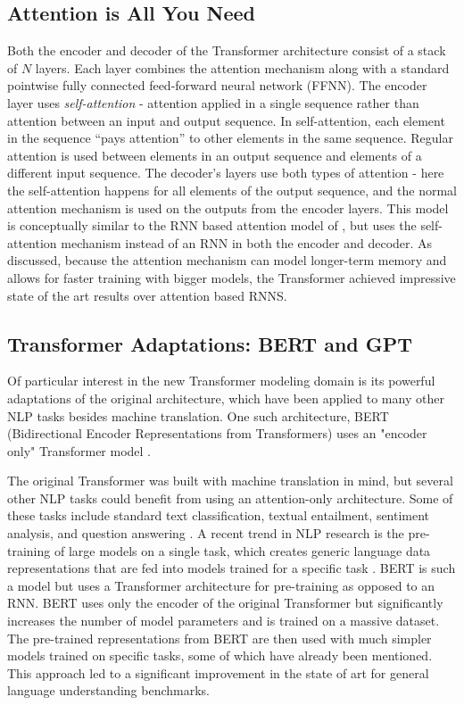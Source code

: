 \subsection{Attention is All You Need}
Both the encoder and decoder of the Transformer architecture consist of a stack of $N$ layers. Each layer combines the attention mechanism along with a standard pointwise fully connected feed-forward neural network (FFNN). The encoder layer uses \emph{self-attention} - attention applied in a single sequence rather than attention between an input and output sequence. In self-attention, each element in the sequence ``pays attention'' to other elements in the same sequence. Regular attention is used between elements in an output sequence and elements of a different input sequence. The decoder's layers use both types of attention - here the self-attention happens for all elements of the output sequence, and the normal attention mechanism is used on the outputs from the encoder layers. This model is conceptually similar to the RNN based attention model of \citet{bahdanau2014neural}, but uses the self-attention mechanism instead of an RNN in both the encoder and decoder. As discussed, because the attention mechanism can model longer-term memory and allows for faster training with bigger models, the Transformer achieved impressive state of the art results over attention based RNNS. 

\subsection{Transformer Adaptations: BERT and GPT}
Of particular interest in the new Transformer modeling domain is its powerful adaptations of the original architecture, which have been applied to many other NLP tasks besides machine translation. One such architecture, BERT (Bidirectional Encoder Representations from Transformers) uses an "encoder only" Transformer model \cite{devlin2018bert}. 

The original Transformer was built with machine translation in mind, but several other NLP tasks could benefit from using an attention-only architecture. Some of these tasks include standard text classification, textual entailment, sentiment analysis, and question answering . A recent trend in NLP research is the pre-training of large models on a single task, which creates generic language data representations that are fed into models trained for a specific task \cite{peters2018deep}. BERT is such a model but uses a Transformer architecture for pre-training as opposed to an RNN. BERT uses only the encoder of the original Transformer but significantly increases the number of model parameters and is trained on a massive dataset. The pre-trained representations from BERT are then used with much simpler models trained on specific tasks, some of which have already been mentioned. This approach led to a significant improvement in the state of art for general language understanding benchmarks.  

